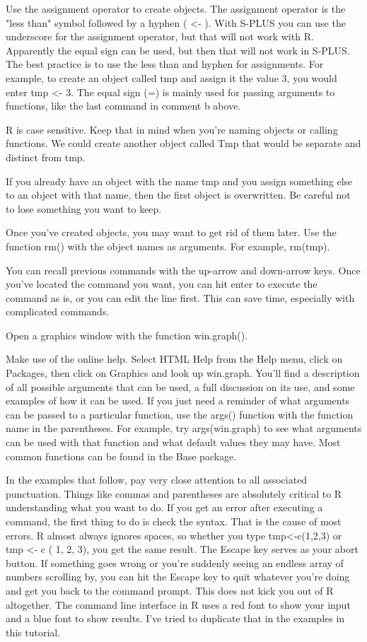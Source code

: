 {Use the assignment operator to create objects. The assignment operator is the "less than" symbol followed by a hyphen ( <- ). With S-PLUS you can use the underscore for the assignment operator, but that will not work with R. Apparently the equal sign can be used, but then that will not work in S-PLUS. The best practice is to use the less than and hyphen for assignments. For example, to create an object called tmp and assign it the value 3, you would enter tmp <- 3. The equal sign (=) is mainly used for passing arguments to functions, like the last command in comment b above. 

R is case sensitive. Keep that in mind when you're naming objects or calling functions. We could create another object called Tmp that would be separate and distinct from tmp. 

If you already have an object with the name tmp and you assign something else to an object with that name, then the first object is overwritten. Be careful not to lose something you want to keep. 

Once you've created objects, you may want to get rid of them later. Use the function rm() with the object names as arguments. For example, rm(tmp). 

You can recall previous commands with the up-arrow and down-arrow keys. Once you've located the command you want, you can hit enter to execute the command as is, or you can edit the line first. This can save time, especially with complicated commands. 

Open a graphics window with the function win.graph(). 

Make use of the online help. Select HTML Help from the Help menu, click on Packages, then click on Graphics and look up win.graph. You'll find a description of all possible arguments that can be used, a full discussion on its use, and some examples of how it can be used. If you just need a reminder of what arguments can be passed to a particular function, use the args() function with the function name in the parentheses. For example, try args(win.graph) to see what arguments can be used with that function and what default values they may have. Most common functions can be found in the Base package. 

In the examples that follow, pay very close attention to all associated punctuation. Things like commas and parentheses are absolutely critical to R understanding what you want to do. If you get an error after executing a command, the first thing to do is check the syntax. That is the cause of most errors. R almost always ignores spaces, so whether you type tmp<-c(1,2,3) or tmp <- c ( 1, 2, 3), you get the same result. 
The Escape key serves as your abort button. If something goes wrong or you're suddenly seeing an endless array of numbers scrolling by, you can hit the Escape key to quit whatever you're doing and get you back to the command prompt. This does not kick you out of R altogether. 
The command line interface in R uses a red font to show your input and a blue font to show results. I've tried to duplicate that in the examples in this tutorial. 

}
